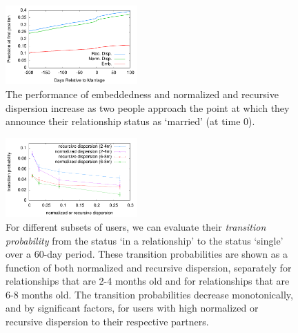 \documentclass{sigchi}
\def\rs{\vspace*{-0.10in}}
\begin{document}
\begin{figure}[t]
\begin{center}
 \includegraphics[width=0.45\textwidth]{perf_since_marriage03.pdf}
\caption{
 \label{fig:over-time-perf}
The performance of embeddedness and normalized
and recursive dispersion increase as two people approach
the point at which they announce their relationship status as `married'
(at time 0).
\rs  
}
\end{center}
\end{figure}


\begin{figure}[t]
\begin{center}
 \includegraphics[width=0.45\textwidth]{ja-disp07.pdf}
\caption{
 \label{fig:ja-disp}
For different subsets of users, we can evaluate their
{\em transition probability} from the status 
`in a relationship' to the status `single' over a 60-day period.
These transition probabilities are shown as a function of
both normalized and recursive dispersion, separately for relationships
that are 2-4 months old and for relationships that are 6-8 months old.
The transition probabilities decrease monotonically, and by
significant factors, for users with high
normalized or recursive dispersion to their respective partners.
\rs \rs 
}
\end{center}
\end{figure}
\end{document}
